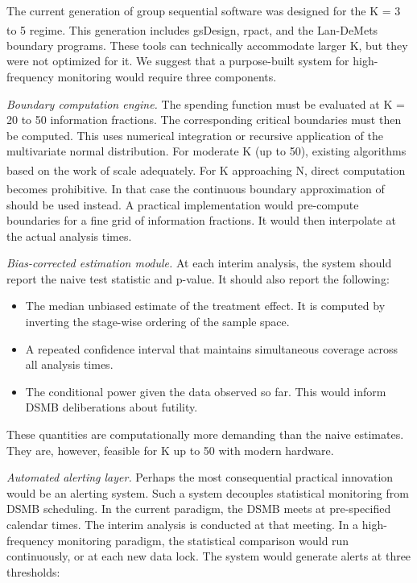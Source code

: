 \documentclass[
  11pt,
]{article}
\providecommand{\tightlist}{%
  \setlength{\itemsep}{0pt}\setlength{\parskip}{0pt}}
\begin{document}
The current generation of group sequential software was
designed for the K = 3 to 5 regime. This generation
includes gsDesign\textsuperscript{}, rpact\textsuperscript{}, and the Lan-DeMets boundary
programs. These tools can technically accommodate
larger K, but they were not optimized for it. We
suggest that a purpose-built system for high-frequency
monitoring would require three components.

\emph{Boundary computation engine.} The spending function
must be evaluated at K = 20 to 50 information
fractions. The corresponding critical boundaries must
then be computed. This uses numerical integration or
recursive application of the multivariate normal
distribution. For moderate K (up to 50), existing
algorithms based on the work of\textsuperscript{}
scale adequately. For K approaching N, direct
computation becomes prohibitive. In that case the
continuous boundary approximation of\textsuperscript{} should be used instead. A
practical implementation would pre-compute boundaries
for a fine grid of information fractions. It would then
interpolate at the actual analysis times.

\emph{Bias-corrected estimation module.} At each interim
analysis, the system should report the naive test
statistic and p-value. It should also report the
following:

\begin{itemize}
\tightlist
\item
  The median unbiased estimate of the treatment effect.
  It is computed by inverting the stage-wise ordering of
  the sample space.
\item
  A repeated confidence interval that maintains
  simultaneous coverage across all analysis times.
\item
  The conditional power given the data observed so
  far. This would inform DSMB deliberations about
  futility.
\end{itemize}

These quantities are computationally more demanding
than the naive estimates. They are, however, feasible
for K up to 50 with modern hardware.

\emph{Automated alerting layer.} Perhaps the most
consequential practical innovation would be an alerting
system. Such a system decouples statistical monitoring
from DSMB scheduling. In the current paradigm, the DSMB
meets at pre-specified calendar times. The interim
analysis is conducted at that meeting. In a
high-frequency monitoring paradigm, the statistical
comparison would run continuously, or at each new data
lock. The system would generate alerts at three
thresholds:
\end{document}
